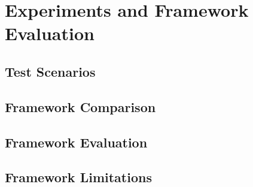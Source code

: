 
\chapter{Experiments and Framework Evaluation\label{chap:experiments_evaluation}}

\todo{}

\section{Test Scenarios}

\todo{}

\section{Framework Comparison}

\todo{}

\section{Framework Evaluation}

\todo{}

\section{Framework Limitations}

\todo{}
